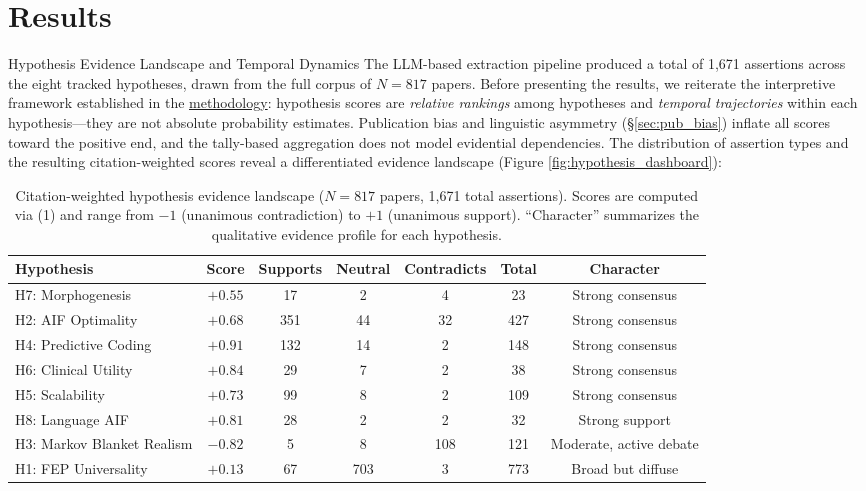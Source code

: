 \documentclass[
  ignorenonframetext,
]{beamer}
\author{\texorpdfstring{}{}}
\date{}
\begin{document}
\section{\texorpdfstring{Results
\label{sec:results}}{Results }}\label{results}

\begin{frame}{Hypothesis Evidence Landscape
and Temporal Dynamics \label{sec:hypothesis_results}}
\protect{}\label{hypothesis-evidence-landscape-and-temporal-dynamics}
The LLM-based extraction pipeline produced a total of 1,671 assertions
across the eight tracked hypotheses, drawn from the full corpus of
\(N = 817\) papers. Before presenting the results, we reiterate the
interpretive framework established in the
\hyperref[sec:methods_kg]{methodology}: hypothesis scores are
\emph{relative rankings} among hypotheses and \emph{temporal
trajectories} within each hypothesis---they are not absolute probability
estimates. Publication bias and linguistic asymmetry
(\S\ref{sec:pub_bias}) inflate all scores toward the positive end, and
the tally-based aggregation does not model evidential dependencies. The
distribution of assertion types and the resulting citation-weighted
scores reveal a differentiated evidence landscape (Figure
\ref{fig:hypothesis_dashboard}):

\begin{table}[htbp]
\centering
\caption{Citation-weighted hypothesis evidence landscape ($N = 817$ papers, 1,671 total assertions). Scores are computed via (1) and range from $-1$ (unanimous contradiction) to $+1$ (unanimous support). ``Character'' summarizes the qualitative evidence profile for each hypothesis.}
\label{tab:hypothesis_evidence}
\begin{tabular}{lcccccc}
\toprule
\textbf{Hypothesis} & \textbf{Score} & \textbf{Supports} & \textbf{Neutral} & \textbf{Contradicts} & \textbf{Total} & \textbf{Character} \\
\midrule
H7: Morphogenesis & $+0.55$ & 17 & 2 & 4 & 23 & Strong consensus \\
H2: AIF Optimality & $+0.68$ & 351 & 44 & 32 & 427 & Strong consensus \\
H4: Predictive Coding & $+0.91$ & 132 & 14 & 2 & 148 & Strong consensus \\
H6: Clinical Utility & $+0.84$ & 29 & 7 & 2 & 38 & Strong consensus \\
H5: Scalability & $+0.73$ & 99 & 8 & 2 & 109 & Strong consensus \\
H8: Language AIF & $+0.81$ & 28 & 2 & 2 & 32 & Strong support \\
H3: Markov Blanket Realism & $-0.82$ & 5 & 8 & 108 & 121 & Moderate, active debate \\
H1: FEP Universality & $+0.13$ & 67 & 703 & 3 & 773 & Broad but diffuse \\
\bottomrule
\end{tabular}
\end{table}


\end{frame}
\end{document}

